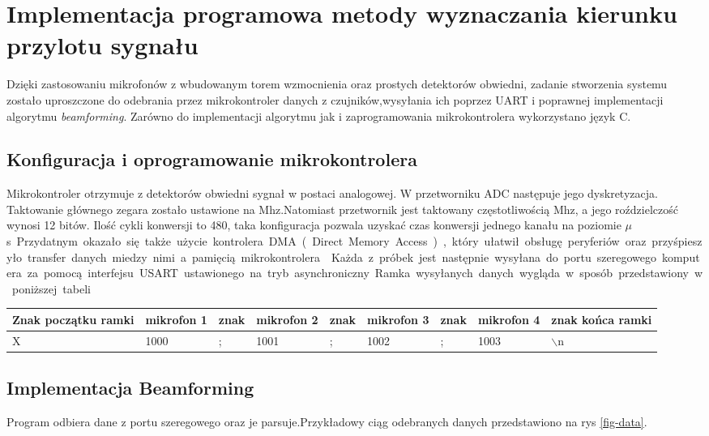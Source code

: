 \documentclass[eng,printmode]{mgr}
\begin{document}
\chapter{Implementacja programowa metody wyznaczania kierunku przylotu sygnału}
Dzięki zastosowaniu mikrofonów z wbudowanym torem wzmocnienia oraz prostych detektorów obwiedni, zadanie stworzenia systemu zostało uproszczone do odebrania przez mikrokontroler danych z czujników,wysyłania ich poprzez UART i poprawnej implementacji algorytmu {\em beamforming}. Zarówno do implementacji algorytmu jak i zaprogramowania mikrokontrolera wykorzystano język C. 
\section{Konfiguracja i oprogramowanie mikrokontrolera}
Mikrokontroler otrzymuje z detektorów obwiedni sygnał w postaci analogowej. W przetworniku ADC następuje jego dyskretyzacja. Taktowanie głównego zegara zostało ustawione na \unit[8]{Mhz}.Natomiast przetwornik jest taktowany częstotliwością \unit[4]{Mhz}, a jego roździelczość wynosi 12 bitów. Ilość cykli konwersji to 480, taka konfiguracja pozwala uzyskać czas konwersji jednego kanału na poziomie \unit[246]{$\mu$s}. Przydatnym okazało się także użycie kontrolera DMA (Direct Memory Access), który ułatwił obsługę peryferiów oraz przyśpieszyło transfer danych miedzy nimi a pamięcią mikrokontrolera.\newline
Każda z próbek jest następnie wysyłana do portu szeregowego komputera za pomocą interfejsu USART ustawionego na tryb asynchroniczny. Ramka wysyłanych danych wygląda w sposób przedstawiony w poniższej tabeli.
\newline
\newline
\begin{tabular}{|j|j|j|j|j|j|j|j|j|} \hline
Znak początku ramki & mikrofon 1 & znak & mikrofon 2 & znak & mikrofon 3 & znak & mikrofon 4 & znak końca ramki \\

\hline 
X & 1000 & ; & 1001 & ; & 1002 & ; & 1003 & $\backslash$n \\ \hline
\end{tabular}


\section{Implementacja Beamforming}
Program odbiera dane z portu szeregowego oraz je parsuje.Przykładowy ciąg odebranych danych przedstawiono na rys \ref{fig-data}. 
\end{document}
